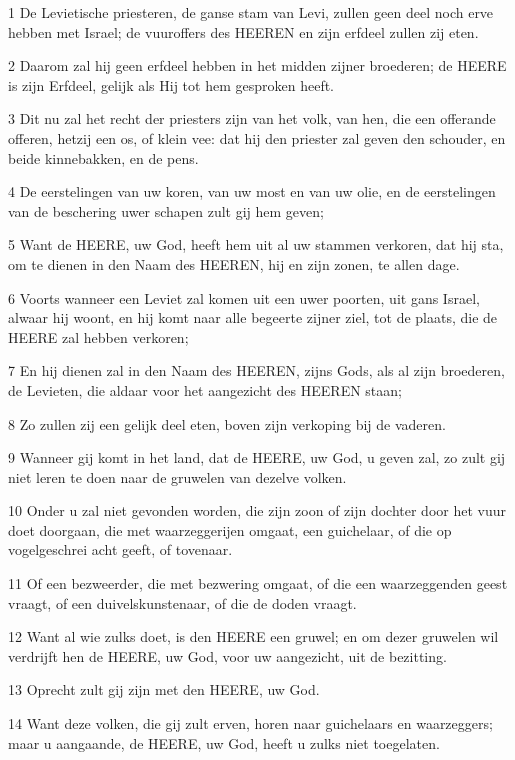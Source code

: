 \par 1 De Levietische priesteren, de ganse stam van Levi, zullen geen deel noch erve hebben met Israel; de vuuroffers des HEEREN en zijn erfdeel zullen zij eten.
\par 2 Daarom zal hij geen erfdeel hebben in het midden zijner broederen; de HEERE is zijn Erfdeel, gelijk als Hij tot hem gesproken heeft.
\par 3 Dit nu zal het recht der priesters zijn van het volk, van hen, die een offerande offeren, hetzij een os, of klein vee: dat hij den priester zal geven den schouder, en beide kinnebakken, en de pens.
\par 4 De eerstelingen van uw koren, van uw most en van uw olie, en de eerstelingen van de beschering uwer schapen zult gij hem geven;
\par 5 Want de HEERE, uw God, heeft hem uit al uw stammen verkoren, dat hij sta, om te dienen in den Naam des HEEREN, hij en zijn zonen, te allen dage.
\par 6 Voorts wanneer een Leviet zal komen uit een uwer poorten, uit gans Israel, alwaar hij woont, en hij komt naar alle begeerte zijner ziel, tot de plaats, die de HEERE zal hebben verkoren;
\par 7 En hij dienen zal in den Naam des HEEREN, zijns Gods, als al zijn broederen, de Levieten, die aldaar voor het aangezicht des HEEREN staan;
\par 8 Zo zullen zij een gelijk deel eten, boven zijn verkoping bij de vaderen.
\par 9 Wanneer gij komt in het land, dat de HEERE, uw God, u geven zal, zo zult gij niet leren te doen naar de gruwelen van dezelve volken.
\par 10 Onder u zal niet gevonden worden, die zijn zoon of zijn dochter door het vuur doet doorgaan, die met waarzeggerijen omgaat, een guichelaar, of die op vogelgeschrei acht geeft, of tovenaar.
\par 11 Of een bezweerder, die met bezwering omgaat, of die een waarzeggenden geest vraagt, of een duivelskunstenaar, of die de doden vraagt.
\par 12 Want al wie zulks doet, is den HEERE een gruwel; en om dezer gruwelen wil verdrijft hen de HEERE, uw God, voor uw aangezicht, uit de bezitting.
\par 13 Oprecht zult gij zijn met den HEERE, uw God.
\par 14 Want deze volken, die gij zult erven, horen naar guichelaars en waarzeggers; maar u aangaande, de HEERE, uw God, heeft u zulks niet toegelaten.
